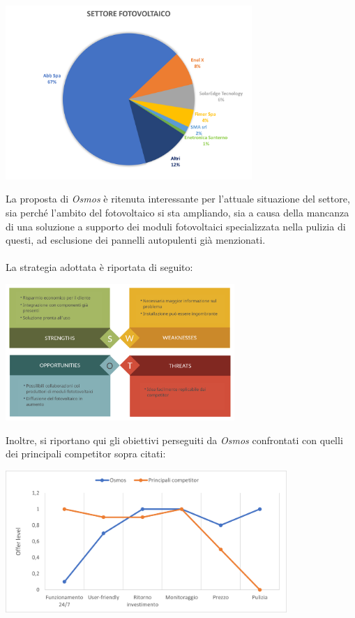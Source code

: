 \documentclass[a4paper, 12pt]{article}
\begin{document}
	\begin{center}
		\includegraphics[width=0.7\textwidth]{Images/suddivisione_settore.png}
	\end{center}
	La proposta di \emph{Osmos} è ritenuta interessante per l'attuale situazione del settore, sia perché l'ambito del fotovoltaico si sta ampliando, sia a causa della mancanza di una soluzione a supporto dei moduli fotovoltaici specializzata nella pulizia di questi, ad esclusione dei pannelli autopulenti già menzionati.\\\\
	La strategia adottata è riportata di seguito:
	\begin{center}
		\includegraphics[width=0.65\textwidth]{Images/SWOT2.png}
	\end{center}
	Inoltre, si riportano qui gli obiettivi perseguiti da \emph{Osmos} confrontati con quelli dei principali competitor sopra citati:
	\begin{center}
		\includegraphics[width=0.8\textwidth]{Images/curve_valore.png}
	\end{center}
\end{document}
